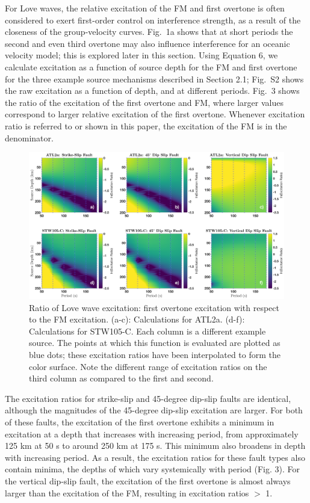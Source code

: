 \documentclass[extra,mreferee]{gji}
\begin{document}
For Love waves, the relative excitation of the FM and first overtone is often considered to exert first-order control on interference strength, as a result of the closeness of the group-velocity curves. Fig.\ 1a shows that at short periods the second and even third overtone may also influence interference for an oceanic velocity model; this is explored later in this section. Using Equation 6, we  calculate excitation as a function of source depth for the FM and first overtone for the three example source mechanisms described in Section 2.1; Fig.\ S2 shows the raw excitation as a function of depth, and at different periods. Fig.\ 3 shows the ratio of the excitation of the first overtone and FM, where larger values correspond to larger relative excitation of the first overtone. Whenever excitation ratio is referred to or shown in this paper, the excitation of the FM is in the denominator.
\begin{figure}
\includegraphics[width=1\textwidth]{Fig3_CorrectedColorbar.eps}
\caption{Ratio of Love wave excitation: first overtone excitation with respect to the FM excitation. (a-c): Calculations for ATL2a. (d-f): Calculations for STW105-C. Each column is a different example source. The points at which this function is evaluated are plotted as blue dots; these excitation ratios have been interpolated to form the color surface. Note the different range of excitation ratios on the third column as compared to the first and second.}
\end{figure}
The excitation ratios for strike-slip and 45-degree dip-slip faults are identical, although the magnitudes of the 45-degree dip-slip excitation are larger. For both of these faults, the excitation of the first overtone exhibits a minimum in excitation at a depth that increases with increasing period, from approximately 125 km at 50 s to around 250 km at 175 s. This minimum also broadens in depth with increasing period. As a result, the excitation ratios for these fault types also contain minima, the depths of which vary systemically with period (Fig. 3). For the vertical dip-slip fault, the excitation of the first overtone is almost always larger than the excitation of the FM, resulting in excitation ratios $>$ 1. 
\end{document}
